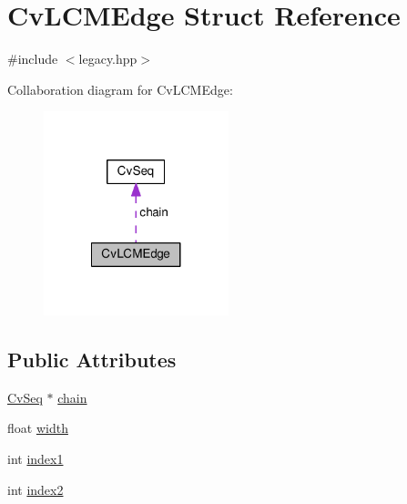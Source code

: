 \hypertarget{structCvLCMEdge}{\section{Cv\-L\-C\-M\-Edge Struct Reference}
\label{structCvLCMEdge}
}


{\ttfamily \#include $<$legacy.\-hpp$>$}



Collaboration diagram for Cv\-L\-C\-M\-Edge\-:\nopagebreak
\begin{figure}[H]
\begin{center}
\leavevmode
\includegraphics[width=152pt]{structCvLCMEdge__coll__graph}
\end{center}
\end{figure}
\subsection*{Public Attributes}
\begin{DoxyCompactItemize}
\item 
\hyperlink{structCvSeq}{Cv\-Seq} $\ast$ \hyperlink{structCvLCMEdge_a8f47f175067ef42be19e9781adc5299b}{chain}
\item 
float \hyperlink{structCvLCMEdge_a019d5f8b6bfa42e85f385114abd24c30}{width}
\item 
int \hyperlink{structCvLCMEdge_a19882fbafe5b891442ab22e062cbf3cb}{index1}
\item 
int \hyperlink{structCvLCMEdge_a6ec313d5a401998156b8f58e203c4fc8}{index2}
\end{DoxyCompactItemize}


